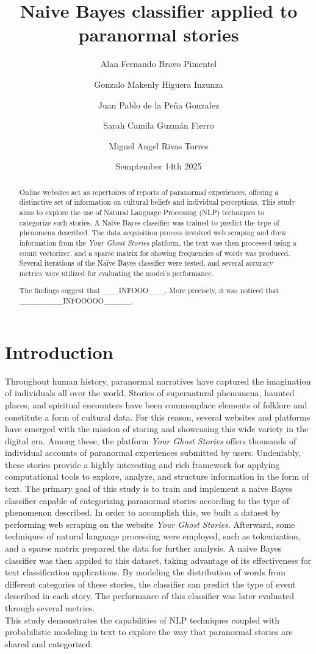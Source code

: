 \documentclass[twocolumn]{article}
\title{Naive Bayes classifier applied to paranormal stories}
\author{
Alan Fernando Bravo Pimentel \and
Gonzalo Makenly Higuera Inzunza \and
Juan Pablo de la Peña Gonzalez \and
Sarah Camila Guzmán Fierro \and
Miguel Angel Rivas Torres
}
\date{Semptember 14th 2025}
\begin{document}
\maketitle

\begin{abstract}
Online websites act as repertoires of reports of paranormal experiences, offering a distinctive set of information on cultural beliefs and individual perceptions. This study aims to  explore the use of Natural Language Processing (NLP) techniques to categorize such stories. A Naive Bayes classifier was trained to predict the type of phenomena described. The data acquisition process involved web scraping and drew information from the \textit{Your Ghost Stories} platform, the text was then processed using a count vectorizer, and a sparse matrix for showing frequencies of words was produced. Several iterations of the Naïve Bayes classifier were tested, and several accuracy metrics were utilized for evaluating the model's performance.  

The findings suggest that \_\_\_INFOOO\_\_\_. More precisely, it was noticed that \_\_\_\_\_\_\_\_INFOOOOO\_\_\_\_\_.  


\end{abstract}

\section{Introduction}
Throughout human history, paranormal narratives have captured the imagination of individuals all over the world. Stories of supernatural phenomena, haunted places, and spiritual encounters have been commonplace elements of folklore and constitute a form of cultural data. For this reason, several websites and platforms have emerged with the mission of storing and showcasing this wide variety in the digital era. Among these, the platform \textit{Your Ghost Stories} offers thousands of individual accounts of paranormal experiences submitted by users. Undeniably, these stories provide a highly interesting and rich framework for applying computational tools to explore, analyze, and structure information in the form of text.
The primary goal of this study is to train and implement a naive Bayes classifier capable of categorizing paranormal stories according to the type of phenomenon described. In order to accomplish this, we built a dataset by performing web scraping on the website \textit{Your Ghost Stories}. Afterward, some techniques of natural language processing were employed, such as tokenization, and a sparse matrix prepared the data for further analysis. 
A naive Bayes classifier was then appiled to this dataset, taking advantage of its effectiveness for text classification applications. By modeling the distribution of words from different categories of these stories, the classifier can predict the type of event described in each story. The performance of this classifier was later evaluated through several metrics. \\
This study demonstrates the capabilities of NLP techniques coupled with probabilistic modeling in text to explore the way that paranormal stories are shared and categorized.
\end{document}
